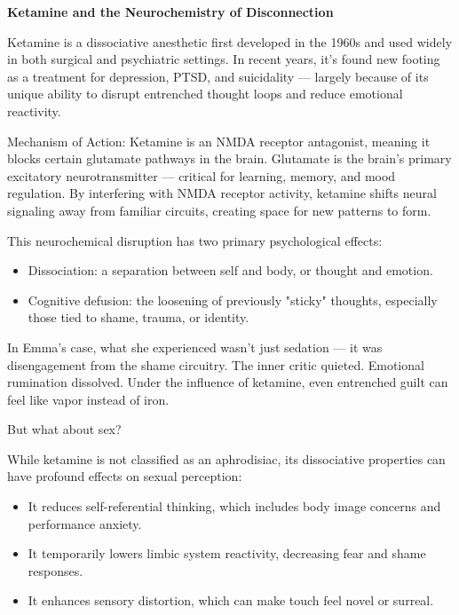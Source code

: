\begin{TechnicalSidebar}{\textbf{Ketamine and the Neurochemistry of Disconnection}}

  Ketamine is a dissociative anesthetic first developed in the 1960s and used widely in both surgical and 
  psychiatric settings. In recent years, it's found new footing as a treatment for depression, PTSD, and 
  suicidality — largely because of its unique ability to disrupt entrenched thought loops and reduce 
  emotional reactivity.
  
  \medskip
  
  Mechanism of Action:
  Ketamine is an NMDA receptor antagonist, meaning it blocks certain glutamate pathways in the brain. 
  Glutamate is the brain’s primary excitatory neurotransmitter — critical for learning, memory, and mood 
  regulation. By interfering with NMDA receptor activity, ketamine shifts neural signaling away from familiar 
  circuits, creating space for new patterns to form.

  \medskip
  
  This neurochemical disruption has two primary psychological effects:
  
  \begin{itemize}
    \item Dissociation: a separation between self and body, or thought and emotion.
    \item Cognitive defusion: the loosening of previously "sticky" thoughts, especially those tied to shame, 
    trauma, or identity.
  \end{itemize}
  
  \medskip
  
  In Emma’s case, what she experienced wasn’t just sedation — it was disengagement from the shame circuitry. The 
  inner critic quieted. Emotional rumination dissolved. Under the influence of ketamine, even entrenched guilt 
  can feel like vapor instead of iron.
  
  \medskip
  
  But what about sex?

  \medskip
  
  While ketamine is not classified as an aphrodisiac, its dissociative properties can have profound effects 
  on sexual perception:

  \medskip
  
  \begin{itemize}
  \item It reduces self-referential thinking, which includes body image concerns and performance anxiety.
  \item It temporarily lowers limbic system reactivity, decreasing fear and shame responses.
  \item It enhances sensory distortion, which can make touch feel novel or surreal.
  \end{itemize}


\end{TechnicalSidebar}
